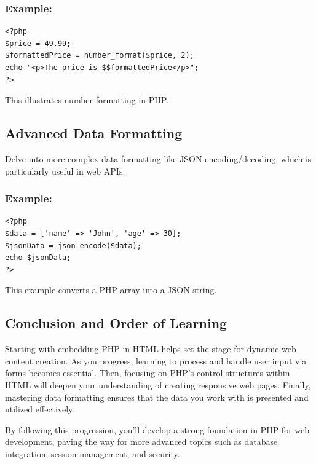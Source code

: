 \documentclass[11pt]{article}
\begin{document}
\subsubsection{Example:}
\label{sec:org50a2b01}
\begin{verbatim}
<?php
$price = 49.99;
$formattedPrice = number_format($price, 2);
echo "<p>The price is $$formattedPrice</p>";
?>
\end{verbatim}

This illustrates number formatting in PHP.

\subsection{Advanced Data Formatting}
\label{sec:org2811f27}
Delve into more complex data formatting like JSON encoding/decoding,
which is particularly useful in web APIs.

\subsubsection{Example:}
\label{sec:org32337ec}
\begin{verbatim}
<?php
$data = ['name' => 'John', 'age' => 30];
$jsonData = json_encode($data);
echo $jsonData;
?>
\end{verbatim}

This example converts a PHP array into a JSON string.

\subsection{Conclusion and Order of Learning}
\label{sec:org1bd0311}
Starting with embedding PHP in HTML helps set the stage for dynamic web
content creation. As you progress, learning to process and handle user
input via forms becomes essential. Then, focusing on PHP's control
structures within HTML will deepen your understanding of creating
responsive web pages. Finally, mastering data formatting ensures that
the data you work with is presented and utilized effectively.

By following this progression, you'll develop a strong foundation in PHP
for web development, paving the way for more advanced topics such as
database integration, session management, and security.
\end{document}
